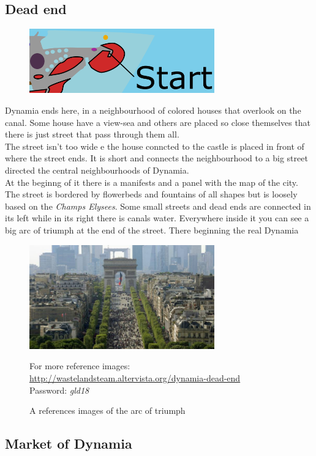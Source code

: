 \subsection{Dead end}
\begin{figure}[H]
    \centering
    \includegraphics[width=8cm]{Images/Maps/deadEnd}
  \end{figure}
Dynamia ends here, in a neighbourhood of colored houses that overlook on the canal. Some house have a view-sea and others are placed so
close themselves that there is just street that pass through them all. \\
The street isn't too wide e the house conncted to the castle is placed in front of where the street ends. 
It is short and connects the neighbourhood to a big street directed the central neighbourhoods of Dynamia. \\
At the beginng of it there is a manifests and a panel with the map of the city. 
The street is bordered by flowerbeds and fountains of all shapes but is loosely based on the \textit{Champs Elysees}.
Some small streets and dead ends are connected in its left while in its right there is canals water.
Everywhere inside it you can see a big arc of triumph at the end of the street. There beginning the real Dynamia
\begin{figure}[H]
    \centering
    \includegraphics[width=8cm]{Images/Landmarks/arcOfTriumph}
    \caption{A references images of the arc of triumph}
    For more reference images: \href{http://wastelandsteam.altervista.org/dynamia-dead-end}{http://wastelandsteam.altervista.org/dynamia-dead-end}\\Password: \textit{gld18}
  \end{figure}

\subsection{Market of Dynamia}

